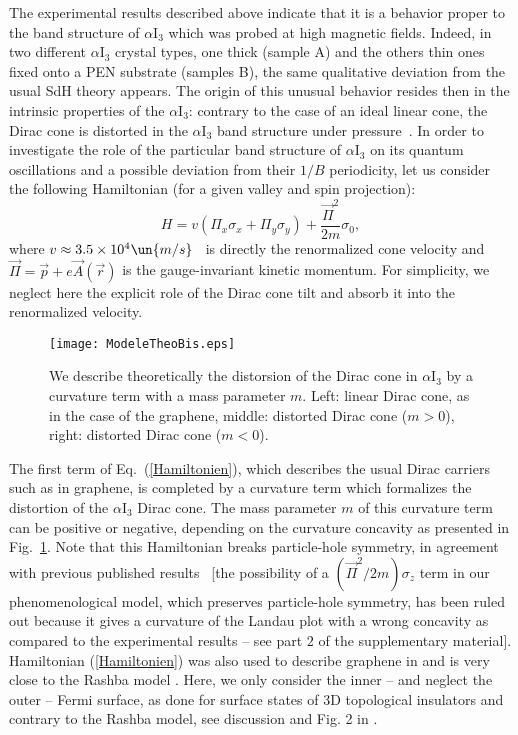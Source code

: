 \documentclass[doublecol]{epl2}
\begin{document}
The experimental results described above indicate that it is a behavior proper to the band structure of $\alpha$I$_{3}$ which was probed at high magnetic fields. 
Indeed, in two different $\alpha$I$_{3}$ crystal types, one thick (sample A) and the others thin ones fixed onto a PEN substrate (samples B), the same qualitative 
deviation from the usual SdH theory appears. The origin of this unusual behavior resides then in the intrinsic properties of the $\alpha$I$_{3}$: contrary to the case of 
an ideal linear cone, the Dirac cone is distorted in the $\alpha$I$_{3}$ band structure under pressure~\cite{alphaCoexistenceTheo}. In order to investigate the role of the 
particular band structure of $\alpha$I$_{3}$ on its quantum oscillations and a possible deviation from their $1/B$ periodicity, let us consider the following Hamiltonian 
(for a given valley and spin projection):
\begin{equation}
\label{Hamiltonien}
H=v\left(\Pi_{x}\sigma_{x}+\Pi_{y}\sigma_{y}\right)+\frac{\vec{\Pi}^2}{2m}\sigma_{0},
\end{equation}
where $v\approx 3.5\times 10^{4}\un{m/s}$~\cite{FermiVelocityAlpha} is directly the renormalized cone velocity and $\vec{\Pi}=\vec{p}+e\vec{A}(\vec{r})$ is the gauge-invariant kinetic momentum. For simplicity, we neglect here the explicit role of the Dirac cone tilt and absorb it into the renormalized velocity.
\begin{figure}
\begin{center}
\texttt{[image: ModeleTheoBis.eps]}
\end{center}
\caption{We describe theoretically the distorsion of the Dirac cone
in $\alpha$I$_{3}$ by a curvature term with a mass parameter $m$. Left: linear Dirac cone, as in the case of the graphene, middle: distorted Dirac cone ($m>0$), right: distorted Dirac cone ($m<0$).}
\label{fig.3}
\end{figure}
The first term of Eq.~(\ref{Hamiltonien}), which describes the usual Dirac carriers such as in graphene, is completed by a curvature term which formalizes the distortion of 
the $\alpha$I$_{3}$ Dirac cone. The mass parameter $m$ of this curvature term can be positive or negative, depending on the curvature concavity as presented 
in Fig.~\ref{fig.3}. Note that this Hamiltonian breaks particle-hole symmetry, in agreement with previous published 
results~\cite{ParticleHoleSymmetry1,ParticleHoleSymmetry2} [the possibility of a $(\vec{\Pi}^2/2m)\sigma_{z}$ term in our phenomenological model, which 
preserves particle-hole symmetry, has been ruled out because it gives a curvature of the Landau plot with a wrong concavity as compared to the experimental results -- 
see part $2$ of the supplementary material]. Hamiltonian (\ref{Hamiltonien}) was also used to describe graphene in \cite{Sharapov} and is very close to the Rashba model \cite{Rashba}. Here, we only consider the inner -- and neglect the outer -- Fermi surface, as done for surface states of 3D topological insulators and contrary to the Rashba model, see discussion and Fig. 2 in \cite{TopolInsulatorsMcKenzie}.
\end{document}
